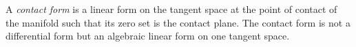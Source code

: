 A \textit{contact form} is a linear form on the tangent space at the point of contact of the manifold such that its zero set is the contact plane. The contact form is not a differential form but an algebraic linear form on one tangent space.
